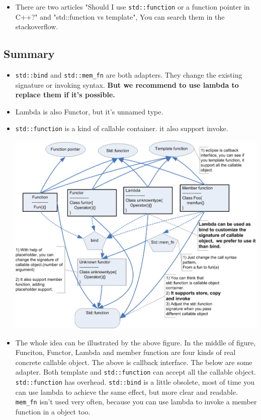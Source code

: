\documentclass[a4paper,11pt,twoside]{book}
\begin{document}
\begin{itemize}
	
	\item There are two articles "Should I use \texttt{std::function} or a function pointer in C++?" and "std::function vs template", You can search them in the stackoverflow.
	
\end{itemize}

\subsection{Summary}
\begin{itemize}
	\item \texttt{std::bind} and \texttt{std::mem\_fn} are both adapters. They change the existing signature or invoking syntax. \textbf{But we recommend to use lambda to replace them if it's possible.}
	
	\item Lambda is also Functor, but it's unnamed type.
	
	\item \texttt{std::function} is a kind of callable container. it also support invoke.
		

\begin{center}
	\includegraphics[width=0.95\linewidth]{pics/callable.png}
\end{center}

	\item The whole idea can be illustrated by the above figure. In the middle of figure, Funciton, Functor, Lambda and member function are four kinds of real concrete callable object. The above is callback interface. The below are some adapter. Both template and \texttt{std::function} can accept all the callable object. \texttt{std::function} has overhead. \texttt{std::bind} is a little obsolete, most of time you can use lambda to achieve the same effect, but more clear and readable. \texttt{mem\_fn} isn't used very often, because you can use lambda to invoke a member function in a object too.  
	
\end{itemize}
\end{document}

